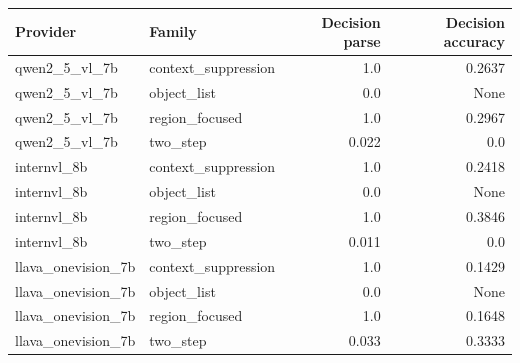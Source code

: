 \begin{tabular}{llrr}
\toprule
Provider & Family & Decision parse & Decision accuracy \\
\midrule
qwen2\_5\_vl\_7b & context\_suppression & 1.0 & 0.2637 \\
qwen2\_5\_vl\_7b & object\_list & 0.0 & None \\
qwen2\_5\_vl\_7b & region\_focused & 1.0 & 0.2967 \\
qwen2\_5\_vl\_7b & two\_step & 0.022 & 0.0 \\
internvl\_8b & context\_suppression & 1.0 & 0.2418 \\
internvl\_8b & object\_list & 0.0 & None \\
internvl\_8b & region\_focused & 1.0 & 0.3846 \\
internvl\_8b & two\_step & 0.011 & 0.0 \\
llava\_onevision\_7b & context\_suppression & 1.0 & 0.1429 \\
llava\_onevision\_7b & object\_list & 0.0 & None \\
llava\_onevision\_7b & region\_focused & 1.0 & 0.1648 \\
llava\_onevision\_7b & two\_step & 0.033 & 0.3333 \\
\bottomrule
\end{tabular}
